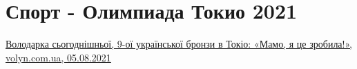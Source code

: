  
 
 
 
 
\chapter{Спорт - Олимпиада Токио 2021}
\label{sec:topics.sport.olimpiada.tokio.2021}


\href{https://www.volyn.com.ua/news/189579-volodarka-sohodnishnoi-9-oi-ukrainskoi-bronzy-v-tokio-mamo-ia-tse-zrobyla}{%
Володарка сьогоднішньої, 9-ої української бронзи в Токіо: «Мамо, я це зробила!», volyn.com.ua, 05.08.2021%
}


